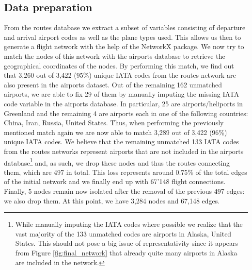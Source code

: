\documentclass{Resources/netsci-project}
\begin{document}
\subsection{Data preparation}
From the routes database we extract a subset of variables consisting of departure and arrival airport codes as well as the plane types used. This allows us then to generate a flight network with the help of the NetworkX package. We now try to match the nodes of this network with the airports database to retrieve the geographical coordinates of the nodes. By performing this match, we find out that 3,260 out of 3,422 (95\%) unique IATA codes from the routes network are also present in the airports dataset. Out of the remaining 162 unmatched airports, we are able to fix 29 of them by manually imputing the missing IATA code variable in the airports database. In particular, 25 are airports/heliports in Greenland and the remaining 4 are airports each in one of the following countries: China, Iran, Russia, United States. Thus, when performing the previously mentioned match again we are now able to match 3,289 out of 3,422 (96\%) unique IATA codes. We believe that the remaining unmatched 133 IATA codes from the routes networks represent airports that are not included in the airports database\footnote{While manually imputing the IATA codes where possible we realize that the vast majority of the 133 unmatched codes are airports in Alaska, United States. This should not pose a big issue of representativity since it appears from Figure \ref{fig:final_network} that already quite many airports in Alaska are included in the network.} and, as such, we drop these nodes and thus the routes connecting them, which are 497 in total. This loss represents around 0.75\% of the total edges of the initial network and we finally end up with 67’148 flight connections. Finally, 5 nodes remain now isolated after the removal of the previous 497 edges: we also drop them. At this point, we have 3,284 nodes and 67,148 edges. \\
\end{document}
